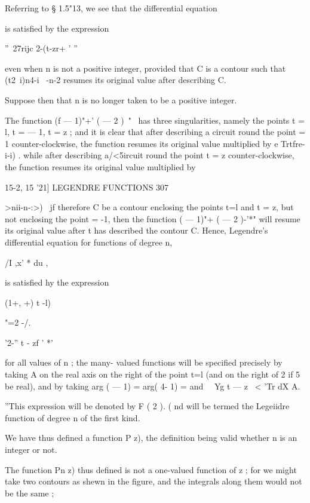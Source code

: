{Referring to § 1.5"13, we see that the differential equation 

is satisfied by the expression 

''~27rijc 2-(t-zr+ ' '' 

even when n is not a positive integer, provided that C is a contour such that 
(t2\  i)n4-i \  -n-2 resumes its original value after describing C. 

Suppose then that n is no longer taken to be a positive integer. 

The function (f  — 1)"+' (  — 2 )~"~  has three singularities, namely the 
points t = l, t = — 1, t = z ; and it is clear that after describing a circuit round 
the point   = 1 counter-clockwise, the function resumes its original value 
multiplied by e Trtfre-i-i) . while after describing a/<5ircuit round the point t =  z 
counter-clockwise, the function resumes its original value multiplied by 



15-2, 15 '21] LEGENDRE FUNCTIONS 307 

  >nii-n-:>) \  jf therefore C be a contour enclosing the points t=l and t = z, but 
not enclosing the point   = -1, then the function (  — 1)"+  (  — 2 )-'*"  will 
resume its original value after t has described the contour C. Hence, 
Legendre's differential equation for functions of degree n, 

/I ,x'  *   du , 

is satisfied hy the expression 

(1+, +)  t -l) 



"=2 -/. 



  '2-''  t - zf ' *' 

for all values of n ; the many- valued functions will be specified precisely 
by taking A on the real axis on the right of the point t=l (and on the 
right of 2 if 5 be real), and by taking arg (  — 1) = arg( 4- 1) = and 
\ \  Yg t — z \ < 'Tr dX A. 

''This expression will be denoted by F  ( 2 ). ( nd will be termed the Legeiidre 
function of degree n of the first kind. 

We have thus defined a function P   z), the definition being valid whether 
n is an integer or not. 

The function Pn z) thus defined is not a one-valued function of z ; for we might take 
two contours as shewn in the figure, and the integrals along them would not be the same ; 




}
